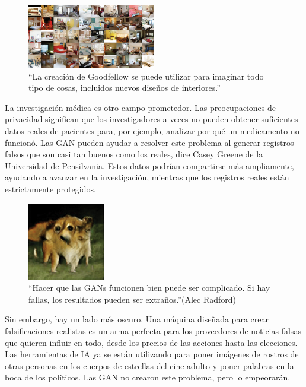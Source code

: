 \documentclass[a4paper]{article}
\begin{document}
\begin{figure} %
    \centering
     \includegraphics[width=0.5\textwidth]{./images/interiores.png}
	  \caption{``La creación de Goodfellow se puede utilizar para imaginar todo tipo de cosas, incluidos nuevos diseños de interiores.''}
\end{figure}




La investigación médica es otro campo prometedor. Las 
preocupaciones de privacidad significan que los investigadores a 
veces no pueden obtener suficientes datos reales de pacientes 
para, por ejemplo, analizar por qué un medicamento no funcionó. 
Las GAN pueden ayudar a resolver este problema al generar 
registros falsos que son casi tan buenos como los reales, dice 
Casey Greene de la Universidad de Pensilvania. Estos datos podrían 
compartirse más ampliamente, ayudando a avanzar en la 
investigación, mientras que los registros reales están 
estrictamente protegidos.
\begin{figure} %
    \centering
     \includegraphics[width=0.3\textwidth]{./images/rares_images.png}
	  \caption{``Hacer que las GANs funcionen bien puede ser complicado. Si hay fallas, los resultados pueden ser extraños.''(Alec Radford)}
\end{figure}
Sin embargo, hay un lado más oscuro. Una máquina diseñada para 
crear falsificaciones realistas es un arma perfecta para los 
proveedores de noticias falsas que quieren influir en todo, desde 
los precios de las acciones hasta las elecciones. Las herramientas 
de IA ya se están utilizando para poner imágenes de rostros de 
otras personas en los cuerpos de estrellas del cine adulto y poner 
palabras en la boca de los políticos. Las GAN no crearon este 
problema, pero lo empeorarán.
 
\end{document}
